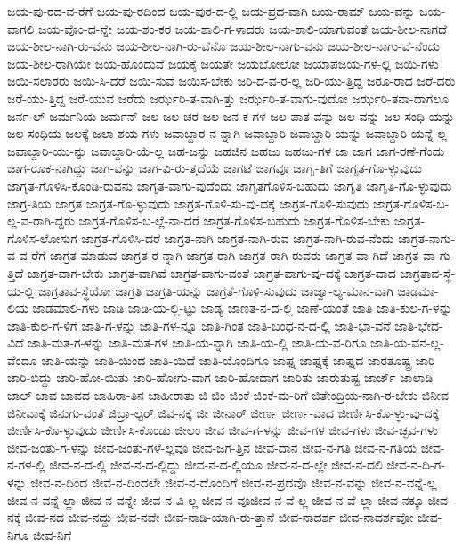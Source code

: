 {ಜಯ-ಪು-ರದ-ವ-ರೆಗೆ
ಜಯ-ಪು-ರದಿಂದ
ಜಯ-ಪುರ-ದ-ಲ್ಲಿ
ಜಯ-ಪ್ರದ-ವಾಗಿ
ಜಯ-ರಾಮ್
ಜಯ-ವನ್ನು
ಜಯ-ವಾಗಲಿ
ಜಯ-ವೊಂ-ದ-ನ್ನೇ
ಜಯ-ಶಂ-ಕರ
ಜಯ-ಶಾಲಿ-ಗ-ಳಾದರು
ಜಯ-ಶಾಲಿ-ಯಾಗುವಂತೆ
ಜಯ-ಶೀಲ-ನಾಗದೆ
ಜಯ-ಶೀಲ-ನಾಗಿ-ರು-ವೆನು
ಜಯ-ಶೀಲ-ನಾಗಿ-ರು-ವೆನೊ
ಜಯ-ಶೀಲ-ನಾಗು-ವನು
ಜಯ-ಶೀಲ-ನಾಗು-ವೆ-ನೆಂದು
ಜಯ-ಶೀಲ-ರಾಗಿಯೇ
ಜಯ-ಹೊಂದುವೆ
ಜಯಕ್ಕೆ
ಜಯತೇ
ಜಯಬೋಲೋ
ಜಯಾಪಜಯ-ಗಳ-ಲ್ಲಿ
ಜಯಿ-ಗಳು
ಜಯಿ-ಸಲಾರರು
ಜಯಿ-ಸಿ-ದರೆ
ಜಯಿ-ಸುವೆ
ಜಯಿಸ-ಬೇಕು
ಜರಿ-ದ-ವ-ರ-ಲ್ಲ
ಜರಿ-ಯು-ತ್ತಿದ್ದ
ಜರೂ-ರಾದ
ಜರೆ-ದರು
ಜರೆ-ಯು-ತ್ತಿದ್ದ
ಜರೆ-ಯುವ
ಜರೆದು
ಜರ್ಝರಿ-ತ-ವಾಗಿ-ತ್ತು
ಜರ್ಝರಿ-ತ-ವಾಗು-ವುದೋ
ಜರ್ಝರಿ-ತನಾ-ದಾಗಲೂ
ಜರ್ನ-ಲ್
ಜರ್ಮನಿಯ
ಜರ್ಮನ್
ಜಲ
ಜಲ-ಚರ
ಜಲ-ಜನ-ಕ-ಗಳ
ಜಲ-ಪಾತ-ವನ್ನು
ಜಲ-ವನ್ನು
ಜಲ-ಸಂಧಿ-ಯನ್ನು
ಜಲ-ಸಂಧಿಯ
ಜಲಕ್ಕೆ
ಜಲಾ-ಶಯ-ಗಳು
ಜವಾಬ್ದಾರ-ನ-ನ್ನಾಗಿ
ಜವಾಬ್ದಾರಿ
ಜವಾಬ್ದಾರಿ-ಯನ್ನು
ಜವಾಬ್ದಾರಿ-ಯನ್ನೆ-ಲ್ಲ
ಜವಾಬ್ದಾರಿ-ಯು-ನ್ನು
ಜವಾಬ್ದಾರಿ-ಯೆ-ಲ್ಲ
ಜಹ-ಜನ್ನು
ಜಹಜಿನ
ಜಹಜು
ಜಹಜು-ಗಳ
ಜಾ
ಜಾಗ
ಜಾಗ-ರಣೆ-ಗೆಂದು
ಜಾಗ-ರೂಕ-ನಾಗಿದ್ದು
ಜಾಗ-ವನ್ನು
ಜಾಗ-ವಿ-ರು-ತ್ತದೆಯೆ
ಜಾಗಟೆ
ಜಾಗವೂ
ಜಾಗೃ-ತಿಗೆ
ಜಾಗೃತ-ಗೊ-ಳ್ಳುವುದು
ಜಾಗೃತ-ಗೊಳಿಸಿ-ಕೊಂಡಿ-ರುವನು
ಜಾಗೃತ-ವಾಗು-ವುದೆಂದು
ಜಾಗೃತಗೊಳಿಸ-ಬಹುದು
ಜಾಗೃತಿ
ಜಾಗೃತಿ-ಗೊ-ಳ್ಳುವುದು
ಜಾಗ್ರ-ತಿಯ
ಜಾಗ್ರತ
ಜಾಗ್ರತ-ಗೊ-ಳ್ಳುವುದು
ಜಾಗ್ರತ-ಗೊಳಿ-ಸು-ವು-ದಕ್ಕೆ
ಜಾಗ್ರತ-ಗೊಳಿ-ಸುವುದು
ಜಾಗ್ರತ-ಗೊಳಿಸ-ಬ-ಲ್ಲ-ವ-ರಾಗಿ-ದ್ದರು
ಜಾಗ್ರತ-ಗೊಳಿಸ-ಬ-ಲ್ಲೆ-ನಾ-ದರೆ
ಜಾಗ್ರತ-ಗೊಳಿಸ-ಬಹುದು
ಜಾಗ್ರತ-ಗೊಳಿಸ-ಬೇಕು
ಜಾಗ್ರತ-ಗೊಳಿಸ-ಲೋಸುಗ
ಜಾಗ್ರತ-ಗೊಳಿಸಿ-ದರೆ
ಜಾಗ್ರತ-ನಾಗಿ
ಜಾಗ್ರತ-ನಾಗಿ-ರುವ
ಜಾಗ್ರತ-ನಾಗಿ-ರುವ-ನೆಂದು
ಜಾಗ್ರತ-ನಾಗು-ವ-ವ-ರೆಗೆ
ಜಾಗ್ರತ-ಮಾಡುವ
ಜಾಗ್ರತ-ರ-ನ್ನಾಗಿ
ಜಾಗ್ರತ-ರಾಗಿ
ಜಾಗ್ರತ-ರಾಗಿ-ರುವರು
ಜಾಗ್ರತ-ವಾ-ಗಿದೆ
ಜಾಗ್ರತ-ವಾ-ಗು-ತ್ತಿದೆ
ಜಾಗ್ರತ-ವಾಗ-ಬೇಕು
ಜಾಗ್ರತ-ವಾಗಿವೆ
ಜಾಗ್ರತ-ವಾಗು-ವಂತೆ
ಜಾಗ್ರತ-ವಾಗು-ವು-ದಕ್ಕೆ
ಜಾಗ್ರತ-ವಾದ
ಜಾಗ್ರತಾವ-ಸ್ಥೆ-ಯ-ಲ್ಲಿ
ಜಾಗ್ರತಾವ-ಸ್ಥೆಯೋ
ಜಾಗ್ರತಿ
ಜಾಗ್ರತಿ-ಯನ್ನು
ಜಾಗ್ರತೆ-ಗೊಳಿ-ಸುವುದು
ಜಾಜ್ವಾ-ಲ್ಯ-ಮಾನ-ವಾಗಿ
ಜಾಡಮಾ-ಲಿಯ
ಜಾಡಮಾಲಿ-ಗಳು
ಜಾಡಿ
ಜಾಡಿ-ಯ-ಲ್ಲಿ-ಟ್ಟು
ಜಾಡ್ಯ
ಜಾಣತ-ನ-ದ-ಲ್ಲಿ
ಜಾಣೆ-ಯಂತೆ
ಜಾತಿ
ಜಾತಿ-ಕುಲ-ಗ-ಳನ್ನು
ಜಾತಿ-ಕುಲ-ಗ-ಳಿಗೆ
ಜಾತಿ-ಗ-ಳನ್ನು
ಜಾತಿ-ಗಳ-ನ್ನೂ
ಜಾತಿ-ಗಿಂತ
ಜಾತಿ-ಬಂಧ-ನ-ದ-ಲ್ಲಿ
ಜಾತಿ-ಭಾ-ವನೆ
ಜಾತಿ-ಭೇದ-ವಿದೆ
ಜಾತಿ-ಮತ-ಗ-ಳನ್ನು
ಜಾತಿ-ಮತ-ಗಳ
ಜಾತಿ-ಯ-ನ್ನಾಗಿ
ಜಾತಿ-ಯ-ಲ್ಲಿ
ಜಾತಿ-ಯ-ವ-ರಿಗೂ
ಜಾತಿ-ಯ-ವನ-ಲ್ಲ-ವೆಂದೂ
ಜಾತಿ-ಯನ್ನು
ಜಾತಿ-ಯಿಂದ
ಜಾತಿ-ಯಿದೆ
ಜಾತಿ-ಯೊಂದಿಗೂ
ಜಾಫ್ನ
ಜಾಫ್ನಕ್ಕೆ
ಜಾಫ್ನದ
ಜಾರತೂಷ್ಟ್ರ
ಜಾರಿ
ಜಾರಿ-ಬಿದ್ದು
ಜಾರಿ-ಹೋ-ಯಿತು
ಜಾರಿ-ಹೋಗು-ವಾಗ
ಜಾರಿ-ಹೋದಾಗ
ಜಾರಿತು
ಜಾರುತುಷ್ಟ
ಜಾರ್ಜ್
ಜಾಲಾಡಿ
ಜಾಲ್
ಜಾವ
ಜಾವದ
ಜಾಹಿರಾ-ತಿನ
ಜಾಹೀರಾತು
ಜಿ
ಜಿಂ
ಜಿಂಕೆ
ಜಿಂಕೆ-ಮ-ರಿಗೆ
ಜಿತೇಂದ್ರಿಯ-ನಾಗಿ-ರ-ಬೇಕು
ಜಿನೀವ
ಜಿನೀವಾಕ್ಕೆ
ಜಿನುಗು-ವಂತೆ
ಜಿಬ್ರಾ-ಲ್ಟರ್
ಜಿವ-ನಕ್ಕೆ
ಜೀ
ಜೀನಾರ್
ಜೀರ್ಣ
ಜೀರ್ಣ-ವಾದ
ಜೀರ್ಣಿಸಿ-ಕೊ-ಳ್ಳು-ವು-ದಕ್ಕೆ
ಜೀರ್ಣಿಸಿ-ಕೊ-ಳ್ಳುವುದು
ಜೀರ್ಣಿಸಿ-ಕೊಂಡು
ಜೀಲಂ
ಜೀವ
ಜೀವ-ಗ-ಳನ್ನು
ಜೀವ-ಗಳ
ಜೀವ-ಗಳು
ಜೀವ-ಚ್ಛವ-ಗಳು
ಜೀವ-ಜಂತು-ಗ-ಳನ್ನು
ಜೀವ-ಜಂತು-ಗಳೆ-ಲ್ಲವೂ
ಜೀವ-ಜಗ-ತ್ತಿನ
ಜೀವ-ದಾನ
ಜೀವ-ನ-ಗತಿ
ಜೀವ-ನ-ಗತಿಯ
ಜೀವ-ನ-ಗಳ-ಲ್ಲಿ
ಜೀವ-ನ-ದ-ಲ್ಲಿ
ಜೀವ-ನ-ದ-ಲ್ಲಿದ್ದು
ಜೀವ-ನ-ದ-ಲ್ಲಿಯೂ
ಜೀವ-ನ-ದ-ಲ್ಲೇ
ಜೀವ-ನ-ದಲಿ
ಜೀವ-ನ-ದಿ-ಗ-ಳನ್ನು
ಜೀವ-ನ-ದಿಂದ
ಜೀವ-ನ-ದಿಂದಲೇ
ಜೀವ-ನ-ದೊಂದಿಗೆ
ಜೀವ-ನ-ಪ್ರದವೊ
ಜೀವ-ನ-ವನ್ನು
ಜೀವ-ನ-ವನ್ನೆ-ಲ್ಲ
ಜೀವ-ನ-ವನ್ನೆ-ಲ್ಲಾ
ಜೀವ-ನ-ವನ್ನೇ
ಜೀವ-ನ-ವಿ-ಲ್ಲ
ಜೀವ-ನ-ವೂಜೀವ-ನ-ವೆ-ಲ್ಲ
ಜೀವ-ನ-ವೆ-ಲ್ಲಾ
ಜೀವ-ನಕ್ಕೂ
ಜೀವ-ನಕ್ಕೆ
ಜೀವ-ನದ
ಜೀವ-ನದ್ದು
ಜೀವ-ನವೇ
ಜೀವ-ನಾಡಿ-ಯಾಗಿ-ರು-ತ್ತಾನೆ
ಜೀವ-ನಾದರ್ಶ
ಜೀವ-ನಾದರ್ಶವೋ
ಜೀವ-ನಿಗೂ
ಜೀವ-ನಿಗೆ
}
